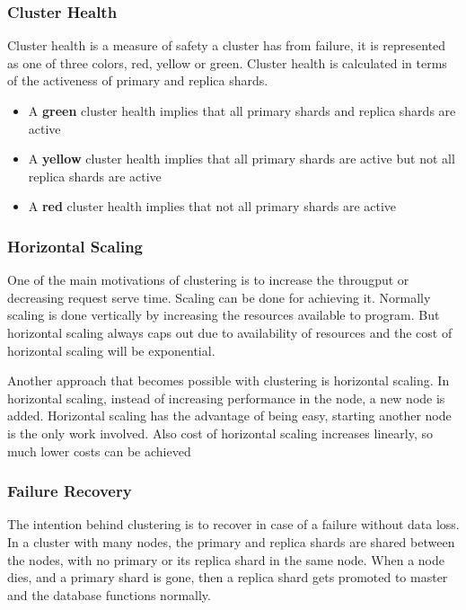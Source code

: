 \documentclass[12pt]{article}
\begin{document}
			\subsubsection{Cluster Health}
				Cluster health is a measure of safety a cluster has from failure, it is represented as one of three colors, red, yellow or green. Cluster health is calculated in terms of the activeness of primary and replica shards.

				\begin{itemize}
				\item A \textbf{green} cluster health implies that all primary shards and replica shards are active
				\item A \textbf{yellow} cluster health implies that all primary shards are active but not all replica shards are active
				\item A \textbf{red} cluster health implies that not all primary shards are active
				\end{itemize}

			\subsubsection{Horizontal Scaling}
				One of the main motivations of clustering is to increase the througput or decreasing request serve time. Scaling can be done for achieving it. Normally scaling is done vertically by increasing the resources available to program. But horizontal scaling always caps out due to availability of resources and the cost of horizontal scaling will be exponential.

				Another approach that becomes possible with clustering is horizontal scaling. In horizontal scaling, instead of increasing performance in the node, a new node is added. Horizontal scaling has the advantage of being easy, starting another node is the only work involved. Also cost of horizontal scaling increases linearly, so much lower costs can be achieved

			\subsubsection{Failure Recovery}
				The intention behind clustering is to recover in case of a failure without data loss. In a cluster with many nodes, the primary and replica shards are shared between the nodes, with no primary or its replica shard in the same node. When a node dies, and a primary shard is gone, then a replica shard gets promoted to master and the database functions normally.
\end{document}

